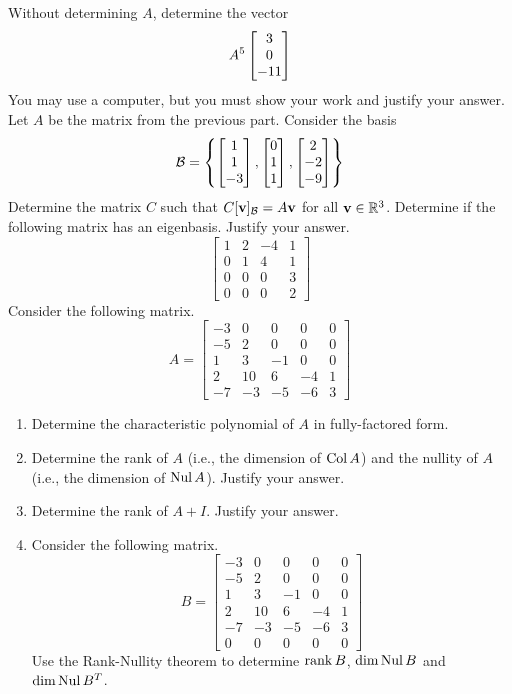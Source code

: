\begin{tasks}[resume, style=enumerate]
\begin{displaymath}
  \end{displaymath}
  Without determining $A$, determine the vector
  \begin{displaymath}
    A^5  \begin{bmatrix} 3 \\ 0 \\ -11 \end{bmatrix} 
  \end{displaymath}
  You may use a computer, but you must show your work and justify your
  answer.
\task
  Let $A$ be the matrix from the previous part.
  Consider the basis
  \begin{displaymath}
    \mathcal B =
    \left\{
     \begin{bmatrix} 1 \\ 1 \\ -3 \end{bmatrix} ,
     \begin{bmatrix} 0 \\ 1 \\ 1 \end{bmatrix} ,
     \begin{bmatrix} 2 \\ -2 \\ -9 \end{bmatrix} 
    \right\}
  \end{displaymath}
  Determine the matrix $C$ such that $C[\mathbf v]_{\mathcal B} = A \mathbf v$ for all
  $\mathbf v \in \mathbb R^3$.
\task
Determine if the following matrix has an eigenbasis. Justify your
answer.
\begin{displaymath}
  \begin{bmatrix}
    1 & 2 & -4 & 1 \\
    0 & 1 & 4 & 1 \\
    0 & 0 & 0 & 3 \\
    0 & 0 & 0 & 2
  \end{bmatrix}
\end{displaymath}
\task
  Consider the following matrix.
  \begin{displaymath}
    A =
    \begin{bmatrix}
      -3 & 0 & 0 & 0 & 0 \\
      -5 & 2 & 0 & 0 & 0 \\
      1 & 3 & -1 & 0 & 0 \\
      2 & 10 & 6 & -4 & 1 \\
      -7 & -3 & -5 & -6 & 3
    \end{bmatrix}
  \end{displaymath}
  \begin{enumerate}[label=(\alph*)]
  \item
    Determine the characteristic polynomial of $A$ in fully-factored form.
  \item
    Determine the rank of $A$ (i.e., the dimension of $\operatorname{\mathrm{Col}} A$) and the
    nullity of $A$ (i.e., the dimension of $\operatorname{\mathrm{Nul}} A$).  Justify your answer.
  \item
    Determine the rank of $A+I$.  Justify your answer.
  \item
    Consider the following matrix.
    \begin{displaymath}
      B =
      \begin{bmatrix}
        -3 & 0 & 0 & 0 & 0 \\
        -5 & 2 & 0 & 0 & 0 \\
        1 & 3 & -1 & 0 & 0 \\
        2 & 10 & 6 & -4 & 1 \\
        -7 & -3 & -5 & -6 & 3 \\
        0 & 0 & 0 & 0 & 0
      \end{bmatrix}
    \end{displaymath}
    Use the Rank-Nullity theorem to determine $\operatorname{\mathrm{rank}} B$, $\dim \operatorname{\mathrm{Nul}} B$
    and $\dim \operatorname{\mathrm{Nul}} B^T$.
  \end{enumerate}
\end{tasks}

